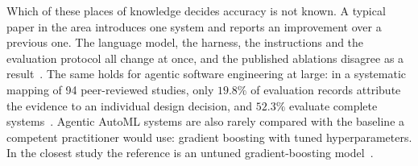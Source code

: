 Which of these places of knowledge decides accuracy is not known. A
typical paper in the area introduces one system and reports an improvement
over a previous one. The language model, the harness, the instructions and
the evaluation protocol all change at once, and the published ablations
disagree as a result~\citep{toledo2025aira,brilliantov2026harness}. The
same holds for agentic software engineering at large: in a systematic
mapping of 94 peer-reviewed studies, only $19.8\%$ of evaluation records attribute the
evidence to an individual design decision, and $52.3\%$ evaluate complete
systems~\citep{diazvillegas2026mapping}. Agentic
AutoML systems are also rarely compared with the baseline a competent
practitioner would use: gradient boosting with tuned hyperparameters. In
the closest study the reference is an untuned gradient-boosting
model~\citep{tsymbalov2026graceds}.

